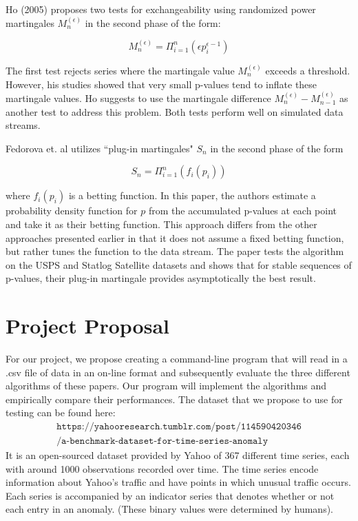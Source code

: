 \documentclass[11pt, margin=1in]{article}
\begin{document}
Ho (2005) proposes two tests for exchangeability using randomized power martingales $M_n^{(\epsilon)}$ in the second phase of the form:

$$M_n^{(\epsilon)} = \Pi_{i = 1}^{n}(\epsilon p_i^{\epsilon - 1})$$

The first test rejects series where the martingale value $M_n^{(\epsilon)}$ exceeds a threshold. However, his studies showed that very small p-values tend to inflate these martingale values. Ho suggests to use the martingale difference $M_n^{(\epsilon)} - M_{n-1}^{(\epsilon)}$ as another test to address this problem. Both tests perform well on simulated data streams. 

Fedorova et. al utilizes ``plug-in martingales" $S_n$ in the second phase of the form

$$S_n = \Pi_{i = 1}^{n}(f_i(p_i))$$

where $f_i(p_i)$ is a betting function. In this paper, the authors estimate a probability density function for $p$ from the accumulated p-values at each point and take it as their betting function. This approach differs from the other approaches presented earlier in that it does not assume a fixed betting function, but rather tunes the function to the data stream. The paper tests the algorithm on the USPS and Statlog Satellite datasets and shows that for stable sequences of p-values, their plug-in martingale provides asymptotically the best result.

\section{Project Proposal}
For our project, we propose creating a command-line program that will read in a .csv file of data in an on-line format and subsequently evaluate the three different algorithms of these papers.  Our program will implement the algorithms and empirically compare their performances.  The dataset that we propose to use for testing can be found here: 
\begin{align*}
\texttt{https://yahooresearch.tumblr.com/post/114590420346} \\ 
\texttt{/a-benchmark-dataset-for-time-series-anomaly}
\end{align*} 
It is an open-sourced dataset provided by Yahoo of 367 different time series, each with around 1000 observations recorded over time.  The time series encode information about Yahoo's traffic and have points in which unusual traffic occurs.  Each series is accompanied by an indicator series that denotes whether or not each entry in an anomaly.  (These binary values were determined by humans).  
\end{document}
